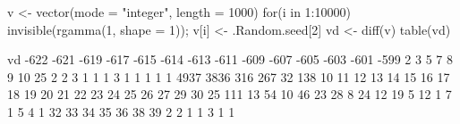 \begin{Schunk}
\begin{Sinput}
 v <- vector(mode = "integer", length = 1000)
 for(i in 1:10000){
  	invisible(rgamma(1, shape = 1)); v[i] <- .Random.seed[2]
  }
 vd <- diff(v)
 table(vd)
\end{Sinput}
\begin{Soutput}
vd
-622 -621 -619 -617 -615 -614 -613 -611 -609 -607 -605 -603 -601 -599    2    3    5    7    8    9 
  10   25    2    2    3    1    1    1    3    1    1    1    1    1 4937 3836  316  267   32  138 
  10   11   12   13   14   15   16   17   18   19   20   21   22   23   24   25   26   27   29   30 
  25  111   13   54   10   46   23   28    8   24   12   19    5   12    1    7    1    5    4    1 
  32   33   34   35   36   38   39 
   2    2    1    1    3    1    1 
\end{Soutput}
\end{Schunk}
